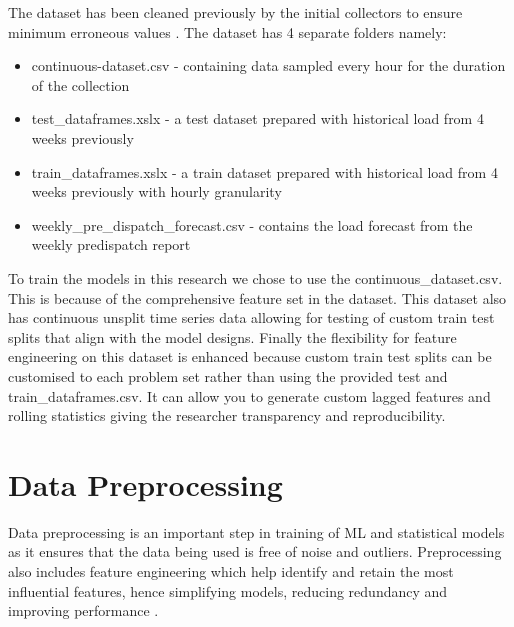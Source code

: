 The dataset has been cleaned previously by the  initial collectors to ensure minimum erroneous values \cite{dataset}. The dataset has 4 separate folders namely:
\begin{itemize}
	\item continuous-dataset.csv - containing data sampled every hour for the duration of the collection
	\item test\_dataframes.xslx - a test dataset prepared with historical load from 4 weeks previously \cite{dataset}
	\item train\_dataframes.xslx - a train dataset prepared with historical load from 4 weeks previously with hourly granularity \cite{dataset}
	\item weekly\_pre\_dispatch\_forecast.csv - contains the load forecast from the weekly predispatch report
\end{itemize}

To train the models in this research we chose to use the continuous\_dataset.csv. This is  because of the comprehensive feature set in the dataset. This dataset also has continuous unsplit time series data allowing for testing of custom train test splits that align with the model designs. Finally the flexibility for feature engineering on this dataset is enhanced because custom train test splits can be customised to each problem set rather than using the provided test and train\_dataframes.csv. It can allow you to generate custom lagged features and rolling statistics giving the researcher transparency and reproducibility.

\section{Data Preprocessing \label{sec:datapreprocessing}}

Data preprocessing is an important step in training of ML and statistical models as it ensures that the data being used is free of noise and outliers. Preprocessing also includes feature engineering which help identify and retain the most influential features, hence simplifying models, reducing redundancy and improving performance \cite{gao2021cooling}.

